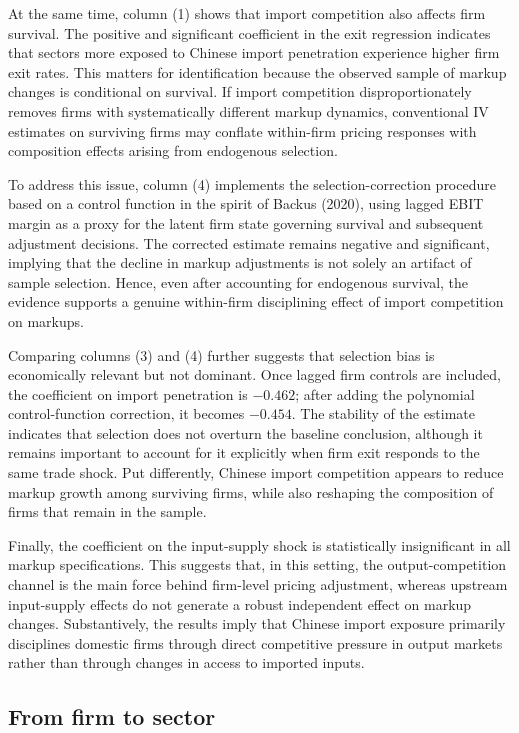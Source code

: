 \documentclass[12pt]{article}
\begin{document}
At the same time, column (1) shows that import competition also affects firm survival. The positive and significant coefficient in the exit regression indicates that sectors more exposed to Chinese import penetration experience higher firm exit rates. This matters for identification because the observed sample of markup changes is conditional on survival. If import competition disproportionately removes firms with systematically different markup dynamics, conventional IV estimates on surviving firms may conflate within-firm pricing responses with composition effects arising from endogenous selection.

To address this issue, column (4) implements the selection-correction procedure based on a control function in the spirit of Backus (2020), using lagged EBIT margin as a proxy for the latent firm state governing survival and subsequent adjustment decisions. The corrected estimate remains negative and significant, implying that the decline in markup adjustments is not solely an artifact of sample selection. Hence, even after accounting for endogenous survival, the evidence supports a genuine within-firm disciplining effect of import competition on markups.

Comparing columns (3) and (4) further suggests that selection bias is economically relevant but not dominant. Once lagged firm controls are included, the coefficient on import penetration is $-0.462$; after adding the polynomial control-function correction, it becomes $-0.454$. The stability of the estimate indicates that selection does not overturn the baseline conclusion, although it remains important to account for it explicitly when firm exit responds to the same trade shock. Put differently, Chinese import competition appears to reduce markup growth among surviving firms, while also reshaping the composition of firms that remain in the sample.

Finally, the coefficient on the input-supply shock is statistically insignificant in all markup specifications. This suggests that, in this setting, the output-competition channel is the main force behind firm-level pricing adjustment, whereas upstream input-supply effects do not generate a robust independent effect on markup changes. Substantively, the results imply that Chinese import exposure primarily disciplines domestic firms through direct competitive pressure in output markets rather than through changes in access to imported inputs.

\subsection{From firm to sector}
\end{document}
